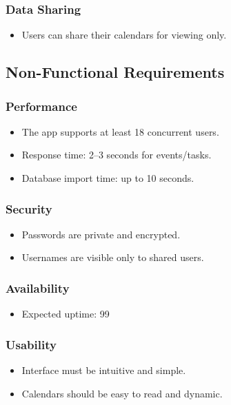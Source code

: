 \documentclass[man]{apa7}
\begin{document}
\subsubsection{Data Sharing}
\begin{itemize}
\item Users can share their calendars for viewing only.
\end{itemize}

\subsection{Non-Functional Requirements}
\subsubsection{Performance}
\begin{itemize}
\item The app supports at least 18 concurrent users.
\item Response time: 2–3 seconds for events/tasks.
\item Database import time: up to 10 seconds.
\end{itemize}

\subsubsection{Security}
\begin{itemize}
\item Passwords are private and encrypted.
\item Usernames are visible only to shared users.
\end{itemize}

\subsubsection{Availability}
\begin{itemize}
\item Expected uptime: 99%
\end{itemize}

\subsubsection{Usability}
\begin{itemize}
\item Interface must be intuitive and simple.
\item Calendars should be easy to read and dynamic.
\end{itemize}
\end{document}
